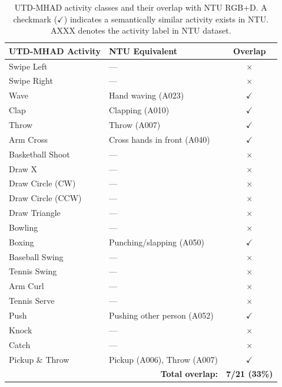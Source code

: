 \begin{table}[!t]
\centering
\caption{UTD-MHAD activity classes and their overlap with NTU RGB+D. A checkmark ($\checkmark$) indicates a semantically similar activity exists in NTU. AXXX denotes the activity label in NTU dataset.}
\label{tab:utd-ntu-overlap}
\begin{tabular}{llc}
\toprule
\textbf{UTD-MHAD Activity} & \textbf{NTU Equivalent} & \textbf{Overlap} \\
\midrule
Swipe Left & --- & $\times$ \\
Swipe Right & --- & $\times$ \\
Wave & Hand waving (A023) & $\checkmark$ \\
Clap & Clapping (A010) & $\checkmark$ \\
Throw & Throw (A007) & $\checkmark$ \\
Arm Cross & Cross hands in front (A040) & $\checkmark$ \\
Basketball Shoot & --- & $\times$ \\
Draw X & --- & $\times$ \\
Draw Circle (CW) & --- & $\times$ \\
Draw Circle (CCW) & --- & $\times$ \\
Draw Triangle & --- & $\times$ \\
Bowling & --- & $\times$ \\
Boxing & Punching/slapping (A050) & $\checkmark$ \\
Baseball Swing & --- & $\times$ \\
Tennis Swing & --- & $\times$ \\
Arm Curl & --- & $\times$ \\
Tennis Serve & --- & $\times$ \\
Push & Pushing other person (A052) & $\checkmark$ \\
Knock & --- & $\times$ \\
Catch & --- & $\times$ \\
Pickup \& Throw & Pickup (A006), Throw (A007) & $\checkmark$ \\
\midrule
\multicolumn{2}{r}{\textbf{Total overlap:}} & \textbf{7/21 (33\%)} \\
\bottomrule
\end{tabular}
\end{table}

